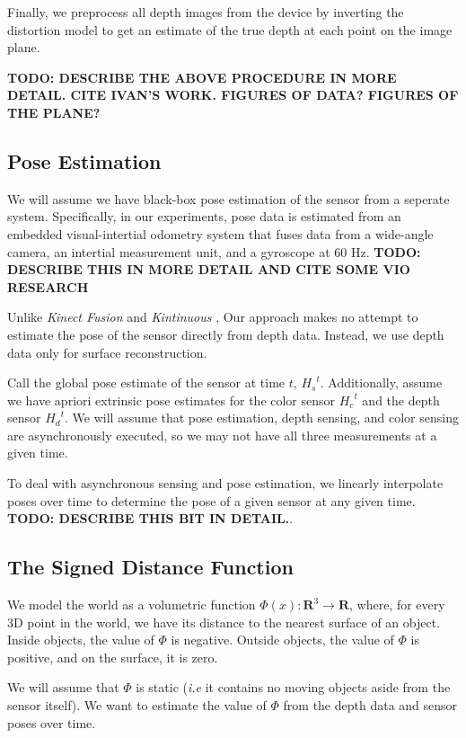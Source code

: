 \documentclass[conference,10pt]{IEEEtran}
\begin{document}
Finally, we preprocess all depth images from the device by inverting the
distortion model to get an estimate of the true depth at each point on the
image plane.

\textbf{TODO: DESCRIBE THE ABOVE PROCEDURE IN MORE DETAIL. CITE IVAN'S WORK.
FIGURES OF DATA? FIGURES OF THE PLANE?}

\subsection{Pose Estimation}
We will assume we have black-box pose estimation of the sensor from a seperate
system. Specifically, in our experiments, pose data is estimated from an
embedded visual-intertial odometry system that fuses data from a wide-angle camera, an
intertial measurement unit, and a gyroscope at 60 Hz. \textbf{TODO: DESCRIBE
THIS IN MORE DETAIL AND CITE SOME VIO RESEARCH}

Unlike \textit{Kinect Fusion} \cite{Newcombe} and \textit{Kintinuous}
\cite{Whelan2013}, Our approach makes no attempt to estimate the pose of the
sensor directly from depth data. Instead, we use depth data only for surface
reconstruction.

Call the global pose estimate of the sensor at time $t$,  ${H_{s}}^t$.
Additionally, assume we have apriori extrinsic pose estimates for the color
sensor ${H_{c}}^t$ and the depth sensor ${H_{d}}^t$. We will assume that pose
estimation, depth sensing, and color sensing are asynchronously executed, so we
may not have all three measurements at a given time.

To deal with asynchronous sensing and pose estimation, we linearly interpolate
poses over time to determine the pose of a given sensor at any given time.
\textbf{TODO: DESCRIBE THIS BIT IN DETAIL.}.

\subsection{The Signed Distance Function}
We model the world as a volumetric function $\Phi(x) : \mathbf{R}^3 \to
\mathbf{R}$, where, for every 3D point in the world, we have its distance to the
nearest surface of an object. Inside objects, the value of $\Phi$ is negative.
Outside objects, the value of $\Phi$ is positive, and on the surface, it is
zero.

 We will assume that $\Phi$ is static (\textit{i.e} it contains no moving
 objects aside from the sensor itself). We want to estimate the value of $\Phi$
 from the depth data and sensor poses over time.
\end{document}
